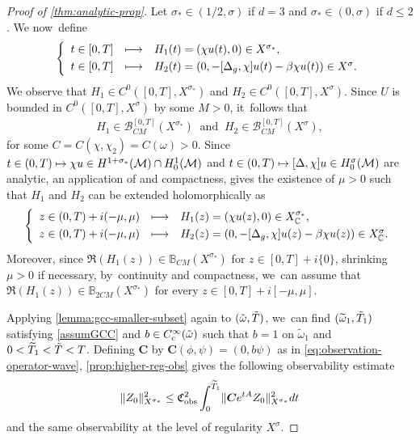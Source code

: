 \documentclass[10pt]{amsart}
\newcommand\mto{\mathchoice{\longmapsto}{\mapsto}{\mapsto}{\mapsto}}
\theoremstyle{definition}
\let\mc\mathcal
\newcommand{\B}{\mc{B}}
\newcommand{\M}{\mc{M}}
\newcommand{\bC}{\boldsymbol{C}}
\providecommand{\norm}[1]{\lVert#1\rVert}
\let\dpl\displaystyle
\begin{document}
\begin{proof}[Proof of \cref{thm:analytic-prop}]
Let $\sigma_*\in (1/2, \sigma)$ if $d=3$ and $\sigma_*\in (0,\sigma)$ if $d\leq 2$. We now~define\vspace*{-3pt}
\begin{align*}
\left\{\begin{array}{ccl}
t\in [0, T] & \dpl\mto & H_1(t)=(\chi u(t), 0)\in X^{\sigma_*}, \\[3pt]
t\in [0, T] & \dpl\mto & H_2(t)=(0, -[\Delta_g, \chi]u(t)-\beta \chi u(t))\in X^\sigma.
\end{array}\right.
\end{align*}
We observe that $H_1\in C^0([0, T], X^{\sigma_*})$ and $H_2\in C^0([0, T], X^\sigma)$. Since $U$ is bounded in $C^0([0, T], X^\sigma)$ by some $M>0$, it~follows that\vspace*{-3pt}
\begin{align*}
H_1\in \B_{CM}^{[0, T]}(X^{\sigma_*})\ \text{ and }\ H_2\in \B_{CM}^{[0, T]}(X^\sigma),
\end{align*}
for some $C=C(\chi,\chi_2)=C(\omega)>0$. Since $t\in (0, T)\mto \chi u\in H^{1+\sigma_*}(\M)\cap H_0^1(\M)$ and $t\in (0, T)\mto [\Delta, \chi] u\in H^{\sigma}_0(\M)$ are analytic, an application of \cite[Th.\,7.2]{BS:71-analytic} and compactness, gives the existence of $\mu>0$ such that $H_1$ and $H_2$ can be extended holomorphically as
\begin{align*}
\left\{\begin{array}{ccl}
z\in (0, T)+i(-\mu, \mu) & \dpl\mto & H_1(z)=(\chi u(z), 0)\in X_\mathbb{C}^{\sigma_*}, \\[3pt]
z\in (0, T)+i(-\mu, \mu) & \dpl\mto & H_2(z)=(0, -[\Delta_g, \chi]u(z)-\beta \chi u(z))\in X_\mathbb{C}^\sigma.
\end{array}\right.
\end{align*}
Moreover, since $\Re(H_1(z))\in \mathbb{B}_{CM}(X^{\sigma_*})$ for $z\in[0,T]+i\{0\}$, shrinking $\mu>0$ if necessary, by~continuity and compactness, we~can assume that $\Re(H_1(z))\in \mathbb{B}_{2CM}(X^{\sigma_*})$ for every $z\in [0, T]+i[-\mu, \mu]$.

Applying \cref{lemma:gcc-smaller-subset} again to $(\Tilde{\omega},\Tilde{T})$, we~can find $(\widetilde{\omega}_1,\Tilde{T}_1)$ satisfying \ref{assumGCC} and $b\in C^{\infty}_c(\Tilde{\omega})$ such that $b=1$ on $\widetilde{\omega}_1$ and $0<\widetilde{T}_1<\Tilde{T}<T$. Defining $\bC$ by $\bC(\phi, \psi)=(0, b\psi)$ as in \eqref{eq:observation-operator-wave}, \cref{prop:higher-reg-obs} gives the following observability estimate\vspace*{-3pt}
\begin{align}\label{thm:ineq:LWobshighTstar}
\norm{Z_0}_{X^{\sigma_*}}^2\leq \mathfrak{C}_{\textup{obs}}^2\int_0^{\widetilde{T}_1} \norm{\bC e^{tA}Z_0}_{X^{\sigma_*}}^2 dt
\end{align}
and the same observability at the level of regularity $X^{\sigma}$.


\end{proof}
\end{document}
